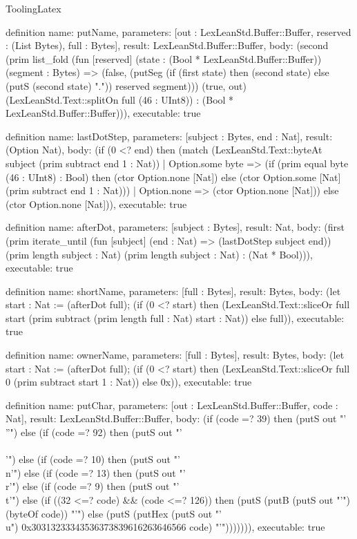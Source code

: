 \begin{lexlean}{ToolingLatex}
\begin{semanticmodule}
definition{
  name: putName,
  parameters: [out : LexLeanStd.Buffer::Buffer, reserved : (List Bytes), full : Bytes],
  result: LexLeanStd.Buffer::Buffer,
  body: (second (prim list_fold (fun [reserved] (state : (Bool * LexLeanStd.Buffer::Buffer)) (segment : Bytes) => (false, (putSeg (if (first state) then (second state) else (putS (second state) ".")) reserved segment))) (true, out) (LexLeanStd.Text::splitOn full (46 : UInt8)) : (Bool * LexLeanStd.Buffer::Buffer))),
  executable: true
}

definition{
  name: lastDotStep,
  parameters: [subject : Bytes, end : Nat],
  result: (Option Nat),
  body: (if (0 <? end) then (match (LexLeanStd.Text::byteAt subject (prim subtract end 1 : Nat))
    | Option.some byte => (if (prim equal byte (46 : UInt8) : Bool) then (ctor Option.none [Nat]) else (ctor Option.some [Nat] (prim subtract end 1 : Nat)))
    | Option.none => (ctor Option.none [Nat])) else (ctor Option.none [Nat])),
  executable: true
}

definition{
  name: afterDot,
  parameters: [subject : Bytes],
  result: Nat,
  body: (first (prim iterate_until (fun [subject] (end : Nat) => (lastDotStep subject end)) (prim length subject : Nat) (prim length subject : Nat) : (Nat * Bool))),
  executable: true
}

definition{
  name: shortName,
  parameters: [full : Bytes],
  result: Bytes,
  body: (let start : Nat := (afterDot full); (if (0 <? start) then (LexLeanStd.Text::sliceOr full start (prim subtract (prim length full : Nat) start : Nat)) else full)),
  executable: true
}

definition{
  name: ownerName,
  parameters: [full : Bytes],
  result: Bytes,
  body: (let start : Nat := (afterDot full); (if (0 <? start) then (LexLeanStd.Text::sliceOr full 0 (prim subtract start 1 : Nat)) else 0x)),
  executable: true
}

definition{
  name: putChar,
  parameters: [out : LexLeanStd.Buffer::Buffer, code : Nat],
  result: LexLeanStd.Buffer::Buffer,
  body: (if (code =? 39) then (putS out "'\\''") else (if (code =? 92) then (putS out "'\\\\'") else (if (code =? 10) then (putS out "'\\n'") else (if (code =? 13) then (putS out "'\\r'") else (if (code =? 9) then (putS out "'\\t'") else (if ((32 <=? code) && (code <=? 126)) then (putS (putB (putS out "'") (byteOf code)) "'") else (putS (putHex (putS out "'\\u") 0x30313233343536373839616263646566 code) "'"))))))),
  executable: true
}


\end{semanticmodule}
\end{lexlean}
